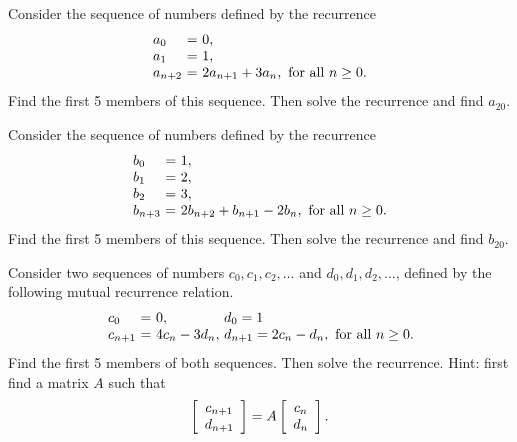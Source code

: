 \documentclass{ximera}
\author{Zack Reed}
\begin{document}
  \begin{problem}
    Consider the sequence of numbers defined by the recurrence
    \begin{equation*}
      \begin{array}{l@{~}c@{~}l}
        a_0 &=& 0, \\
        a_1 &=& 1, \\
        a_{n+2} &=& 2a_{n+1} + 3a_n, \quad\mbox{for all $n\geq 0$.} \\
      \end{array}
    \end{equation*}
    Find the first 5 members of this sequence. Then solve the recurrence
    and find $a_{20}$.
  \end{problem}
  
  \begin{problem}
    Consider the sequence of numbers defined by the recurrence
    \begin{equation*}
      \begin{array}{l@{~}c@{~}l}
        b_0 &=& 1, \\
        b_1 &=& 2, \\
        b_2 &=& 3, \\
        b_{n+3} &=& 2b_{n+2} + b_{n+1} - 2b_n, \quad\mbox{for all $n\geq 0$.} \\
      \end{array}
    \end{equation*}
    Find the first 5 members of this sequence. Then solve the recurrence
    and find $b_{20}$.
  \end{problem}
  
  \begin{problem}
    Consider two sequences of numbers $c_0,c_1,c_2,\ldots$ and
    $d_0,d_1,d_2,\ldots$, defined by the following mutual recurrence
    relation.
    \begin{equation*}
      \begin{array}{l@{~}c@{~}l@{\quad}l@{~}c@{~}l}
        c_0 &=& 0,             & d_0 = 1 \\
        c_{n+1} &=& 4c_n - 3d_n, & d_{n+1} = 2c_n - d_n, \quad\mbox{for all $n\geq 0$.} \\
      \end{array}
    \end{equation*}
    Find the first 5 members of both sequences. Then solve the
    recurrence. Hint: first find a matrix $A$ such that
    \begin{equation*}
      \startmat{c} c_{n+1} \\ d_{n+1} \stopmat
      = A \startmat{c} c_n \\ d_n \stopmat.
    \end{equation*}
  \end{problem}
  
\end{document}
